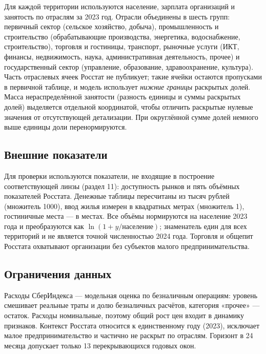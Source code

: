 \documentclass[11pt,a4paper]{article}
\begin{document}
Для каждой территории используются население, зарплата организаций и занятость по отраслям за 2023 год. Отрасли объединены в шесть групп: первичный сектор (сельское хозяйство, добыча), промышленность и строительство (обрабатывающие производства, энергетика, водоснабжение, строительство), торговля и гостиницы, транспорт, рыночные услуги (ИКТ, финансы, недвижимость, наука, административная деятельность, прочее) и государственный сектор (управление, образование, здравоохранение, культура). Часть отраслевых ячеек Росстат не публикует; такие ячейки остаются пропусками в первичной таблице, и модель использует \emph{нижние границы} раскрытых долей. Масса нераспределённой занятости (разность единицы и суммы раскрытых долей) выделяется отдельной координатой, чтобы отличить раскрытые нулевые значения от отсутствующей детализации. При округлённой сумме долей немного выше единицы доли перенормируются.

\subsection{Внешние показатели}\label{ux432ux43dux435ux448ux43dux438ux435-ux43fux43eux43aux430ux437ux430ux442ux435ux43bux438}

Для проверки используются показатели, не входящие в построение соответствующей линзы (раздел 11): доступность рынков и пять объёмных показателей Росстата. Денежные таблицы пересчитаны из тысяч рублей (множитель 1000), ввод жилья измерен в квадратных метрах (множитель 1), гостиничные места --- в местах. Все объёмы нормируются на население 2023 года и преобразуются как \(\ln(1 + y/\text{население})\); знаменатель един для всех территорий и не является точной численностью 2024 года. Торговля и общепит Росстата охватывают организации без субъектов малого предпринимательства.

\subsection{Ограничения данных}\label{ux43eux433ux440ux430ux43dux438ux447ux435ux43dux438ux44f-ux434ux430ux43dux43dux44bux445}

Расходы СберИндекса --- модельная оценка по безналичным операциям: уровень смешивает реальные траты и долю безналичных расчётов, категория «прочее» --- остаток. Расходы номинальные, поэтому общий рост цен входит в динамику признаков. Контекст Росстата относится к единственному году (2023), исключает малое предпринимательство и частично не раскрыт по отраслям. Горизонт в 24 месяца допускает только 13 перекрывающихся годовых окон.
\end{document}
